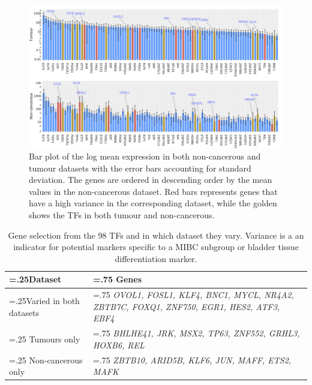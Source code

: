 \begin{figure}[!htb]   
    \centering
    \includegraphics[width=1.0\textwidth,height=1.0\textheight,keepaspectratio]{Sections/Network_I/Resources/selective_pruning/sel_tfs/sel_tfs_var_tum_healthy.png}
      \caption[Mean expression of the 98 TFs in tumour and healthy samples]{Bar plot of the log mean expression in both non-cancerous and tumour datasets with the error bars accounting for standard deviation. The genes are ordered in descending order by the mean values in the non-cancerous dataset. Red bars represents genes that have a high variance in the corresponding dataset, while the golden shows the TFs in both tumour and non-cancerous.}
    \label{fig:N_I:sel_tfs_var}
\end{figure}



\begin{table}[!htb]
  \centering
  \small
  \begin{tabularx}{\textwidth}{>{\hsize=.25\hsize}X|>{\hsize=.75\hsize}X}
    \toprule
    \textbf{Dataset} & \textbf{Genes} \\
    \midrule
    Varied in both datasets & \textit{OVOL1, FOSL1, KLF4, BNC1, MYCL, NR4A2, ZBTB7C, FOXQ1, ZNF750, EGR1, HES2, ATF3, EBF4} \\
    \midrule
    Tumours only & \textit{BHLHE41, JRK, MSX2, TP63, ZNF552, GRHL3, HOXB6, REL} \\
    \midrule
    Non-cancerous only & \textit{ZBTB10, ARID5B, KLF6, JUN, MAFF, ETS2, MAFK} \\
    \bottomrule
  \end{tabularx}
    \caption[Summary of the subset of 98 TFs which are highly varied]{Gene selection from the 98 TFs and in which dataset they vary. Variance is a an indicator for potential markers specific to a MIBC subgroup or bladder tissue differentiation marker.}
    \label{tab:N_I:sel_tfs_var}
\end{table}



